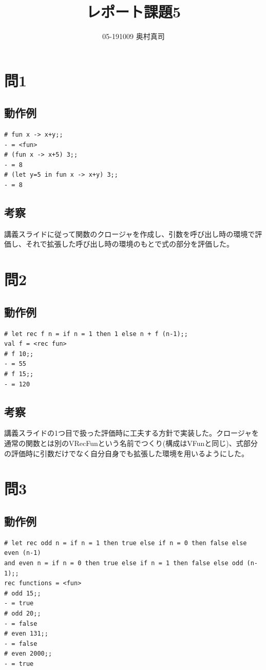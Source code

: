 \documentclass[11pt,a4paper]{jsarticle}
\title{レポート課題5}
\author{05-191009 奥村真司}
\date{}
\begin{document}
\maketitle
%
%
\section*{問1}
\subsection*{動作例}
\begin{lstlisting}[basicstyle=\ttfamily\footnotesize, frame=single]
# fun x -> x+y;;
- = <fun>
# (fun x -> x+5) 3;;       
- = 8
# (let y=5 in fun x -> x+y) 3;;
- = 8
\end{lstlisting}
\subsection*{考察}
講義スライドに従って関数のクロージャを作成し、引数を呼び出し時の環境で評価し、それで拡張した呼び出し時の環境のもとで式の部分を評価した。
\section*{問2}
\subsection*{動作例}
\begin{lstlisting}[basicstyle=\ttfamily\footnotesize, frame=single]
# let rec f n = if n = 1 then 1 else n + f (n-1);;
val f = <rec fun>
# f 10;;
- = 55
# f 15;;
- = 120
\end{lstlisting}
\subsection*{考察}
講義スライドの1つ目で扱った評価時に工夫する方針で実装した。クロージャを通常の関数とは別のVRecFunという名前でつくり(構成はVFunと同じ)、式部分の評価時に引数だけでなく自分自身でも拡張した環境を用いるようにした。
\section*{問3}
\subsection*{動作例}
\begin{lstlisting}[basicstyle=\ttfamily\footnotesize, frame=single]
# let rec odd n = if n = 1 then true else if n = 0 then false else even (n-1)
and even n = if n = 0 then true else if n = 1 then false else odd (n-1);;
rec functions = <fun>
# odd 15;;
- = true
# odd 20;;
- = false
# even 131;;
- = false
# even 2000;;
- = true
\end{lstlisting}
\end{document}
